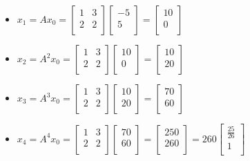 \documentclass[12pt]{article}
\begin{document}
\begin{itemize}
    \item[] $x_1 = Ax_0 = \begin{bmatrix}1 & 3 \\2 & 2 \\\end{bmatrix}\begin{bmatrix}-5 \\5 \\\end{bmatrix} = \begin{bmatrix}10 \\0 \\\end{bmatrix}$
    \item[] $x_2 = A^2x_0 = \begin{bmatrix}1 & 3 \\2 & 2 \\\end{bmatrix}\begin{bmatrix}10 \\0 \\\end{bmatrix} = \begin{bmatrix}10 \\20 \\\end{bmatrix}$
    \item[] $x_3 = A^3x_0 = \begin{bmatrix}1 & 3 \\2 & 2 \\\end{bmatrix}\begin{bmatrix}10 \\20 \\\end{bmatrix} = \begin{bmatrix}70 \\60 \\\end{bmatrix}$
    \item[] $x_4 = A^4x_0 = \begin{bmatrix}1 & 3 \\2 & 2 \\\end{bmatrix}\begin{bmatrix}70 \\60 \\\end{bmatrix} = \begin{bmatrix}250 \\260 \\\end{bmatrix} = 260\begin{bmatrix}\frac{25}{26} \\1 \\\end{bmatrix}$
\end{itemize}
\end{document}
